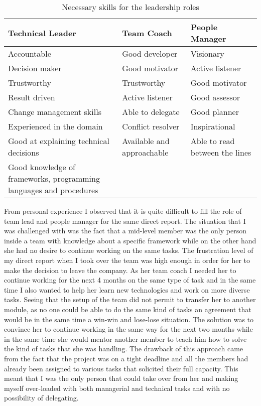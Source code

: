 \begin{table}[htb]
	\centering
	\begin{tabular}{| p{4.2cm} | p{4cm} | p{4.2cm} |}
		\toprule
		 Technical Leader & Team Coach & People Manager \\ \midrule
	    
	    Accountable & Good developer & Visionary\\
	    Decision maker & Good motivator& Active listener \\ 
	     Trustworthy  & Trustworthy & Good motivator \\
	    Result driven & Active listener & Good assessor \\
	    Change management skills&Able to delegate & Good planner \\
	    Experienced in the domain & Conflict resolver & Inspirational \\
	    Good at explaining technical decisions &  Available and approachable & Able to read between the lines \\
	    Good knowledge of frameworks, programming languages and procedures  & & \\
\bottomrule

		\end{tabular}
		\caption{Necessary skills for the leadership roles}
		\label{tab:leader-skills}
\end{table}


From personal experience I observed that it is quite difficult to fill the role of team lead and people manager for the same direct report. The situation that I was challenged with was the fact that a mid-level member was the only person inside a team with knowledge about a specific framework while on the other hand she had no desire to continue working on the same tasks. The frustration level of my direct report when I took over the team was high enough in order for her to make the decision to leave the company. As her team coach I needed her to continue working for the next 4 months on the same type of task and in the same time I also wanted to help her learn new technologies and work on more diverse tasks. Seeing that the setup of the team did not permit to transfer her to another module, as no one could be able to do the same kind of tasks an agreement that would be in the same time a win-win and lose-lose situation. The solution was to convince her to continue working in the same way for the next two months while in the same time she would mentor another member to teach him how to solve the kind of tasks that she was handling. The drawback of this approach came from the fact that the project was on a tight deadline and all the members had already been assigned to various tasks that solicited their full capacity. This meant that I was the only person that could take over from her and making myself over-loaded with both managerial and technical tasks and with no possibility of delegating.
